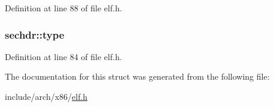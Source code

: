 \-Definition at line 88 of file elf.\-h.

\hypertarget{structsechdr_acffd68b62e2e516fd537869d19041f01}{
\subsubsection[{type}]{ {\bf sechdr\-::type}}}\label{structsechdr_acffd68b62e2e516fd537869d19041f01}


\-Definition at line 84 of file elf.\-h.



\-The documentation for this struct was generated from the following file\-:\begin{DoxyCompactItemize}
\item 
include/arch/x86/\hyperlink{elf_8h}{elf.\-h}\end{DoxyCompactItemize}
